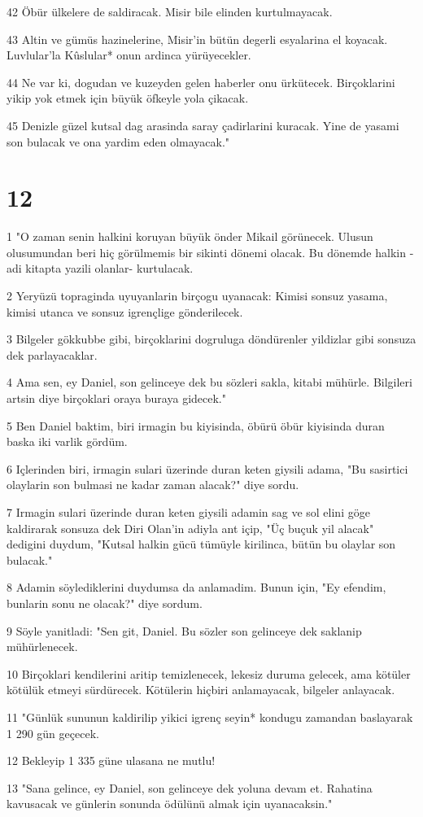 \par 42 Öbür ülkelere de saldiracak. Misir bile elinden kurtulmayacak.
\par 43 Altin ve gümüs hazinelerine, Misir'in bütün degerli esyalarina el koyacak. Luvlular'la Kûslular* onun ardinca yürüyecekler.
\par 44 Ne var ki, dogudan ve kuzeyden gelen haberler onu ürkütecek. Birçoklarini yikip yok etmek için büyük öfkeyle yola çikacak.
\par 45 Denizle güzel kutsal dag arasinda saray çadirlarini kuracak. Yine de yasami son bulacak ve ona yardim eden olmayacak."

\chapter{12}

\par 1 "O zaman senin halkini koruyan büyük önder Mikail görünecek. Ulusun olusumundan beri hiç görülmemis bir sikinti dönemi olacak. Bu dönemde halkin -adi kitapta yazili olanlar- kurtulacak.
\par 2 Yeryüzü topraginda uyuyanlarin birçogu uyanacak: Kimisi sonsuz yasama, kimisi utanca ve sonsuz igrençlige gönderilecek.
\par 3 Bilgeler gökkubbe gibi, birçoklarini dogruluga döndürenler yildizlar gibi sonsuza dek parlayacaklar.
\par 4 Ama sen, ey Daniel, son gelinceye dek bu sözleri sakla, kitabi mühürle. Bilgileri artsin diye birçoklari oraya buraya gidecek."
\par 5 Ben Daniel baktim, biri irmagin bu kiyisinda, öbürü öbür kiyisinda duran baska iki varlik gördüm.
\par 6 Içlerinden biri, irmagin sulari üzerinde duran keten giysili adama, "Bu sasirtici olaylarin son bulmasi ne kadar zaman alacak?" diye sordu.
\par 7 Irmagin sulari üzerinde duran keten giysili adamin sag ve sol elini göge kaldirarak sonsuza dek Diri Olan'in adiyla ant içip, "Üç buçuk yil alacak" dedigini duydum, "Kutsal halkin gücü tümüyle kirilinca, bütün bu olaylar son bulacak."
\par 8 Adamin söylediklerini duydumsa da anlamadim. Bunun için, "Ey efendim, bunlarin sonu ne olacak?" diye sordum.
\par 9 Söyle yanitladi: "Sen git, Daniel. Bu sözler son gelinceye dek saklanip mühürlenecek.
\par 10 Birçoklari kendilerini aritip temizlenecek, lekesiz duruma gelecek, ama kötüler kötülük etmeyi sürdürecek. Kötülerin hiçbiri anlamayacak, bilgeler anlayacak.
\par 11 "Günlük sununun kaldirilip yikici igrenç seyin* kondugu zamandan baslayarak 1 290 gün geçecek.
\par 12 Bekleyip 1 335 güne ulasana ne mutlu!
\par 13 "Sana gelince, ey Daniel, son gelinceye dek yoluna devam et. Rahatina kavusacak ve günlerin sonunda ödülünü almak için uyanacaksin."


